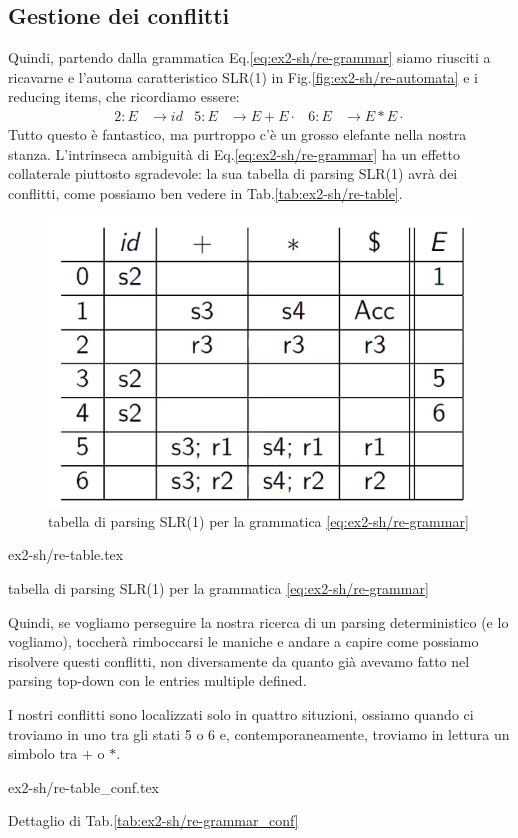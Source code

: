 \documentclass[class=book, crop=false, oneside, 12pt]{standalone}
\begin{document}
\subsection{Gestione dei conflitti}
Quindi, partendo dalla grammatica Eq.\ref{eq:ex2-sh/re-grammar} siamo riusciti a ricavarne e l'automa caratteristico SLR(1) in Fig.\ref{fig:ex2-sh/re-automata} e i reducing items, che ricordiamo essere:
\begin{align*}
    2: E &\to id & 5: E &\to E + E \cdot & 6: E &\to E * E \cdot
\end{align*}
Tutto questo è fantastico, ma purtroppo c'è un grosso elefante nella nostra stanza. L'intrinseca ambiguità di Eq.\ref{eq:ex2-sh/re-grammar} ha un effetto collaterale piuttosto sgradevole: la sua tabella di parsing SLR(1) avrà dei conflitti, come possiamo ben vedere in Tab.\ref{tab:ex2-sh/re-table}.
\begin{figure}[H]
    \center
    \includegraphics[width=.6\textwidth]{ex2-sh_re-table.png}
    \caption{tabella di parsing SLR(1) per la grammatica \ref{eq:ex2-sh/re-grammar}}
\end{figure}
\begin{table}[H]
    \centering
    {ex2-sh/re-table.tex}
    \caption{tabella di parsing SLR(1) per la grammatica \ref{eq:ex2-sh/re-grammar}}
    \label{tab:ex2-sh/re-table}
\end{table}
\noindent Quindi, se vogliamo perseguire la nostra ricerca di un parsing deterministico (e lo vogliamo), toccherà rimboccarsi le maniche e andare a capire come possiamo risolvere questi conflitti, non diversamente da quanto già avevamo fatto nel parsing top-down con le entries multiple defined.

I nostri conflitti sono localizzati solo in quattro situzioni, ossiamo quando ci troviamo in uno tra gli stati 5 o 6 e, contemporaneamente, troviamo in lettura un simbolo tra \(+\) o \(\ast\).
\begin{table}[H]
    \centering
    {ex2-sh/re-table_conf.tex}
    \caption{Dettaglio di Tab.\ref{tab:ex2-sh/re-grammar_conf}}
    \label{tab:ex2-sh/re-table_conf}
\end{table}
\end{document}
